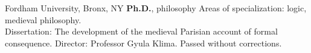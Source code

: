{%
	Fordham University, Bronx, NY}
{%
	\textbf{Ph.D.}, philosophy}
{%
	Areas of specialization: logic, medieval philosophy.
	\\ Dissertation: The development of the medieval Parisian account of formal consequence. Director: Professor Gyula Klima. Passed without corrections.}
